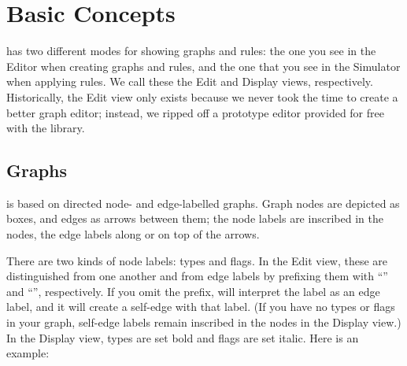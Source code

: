 \section{Basic Concepts}

\Groove has two different modes for showing graphs and rules: the one you see
in the Editor when creating graphs and rules, and the one that you see in the
Simulator when applying rules. We call these the Edit and Display views,
respectively.  Historically, the Edit view only exists because we never took
the time to create a better graph editor; instead, we ripped off a prototype
editor provided for free with the \JGraph library.

\subsection{Graphs}

\Groove is based on directed node- and edge-labelled graphs. Graph nodes are
depicted as boxes, and edges as arrows between them; the node labels are
inscribed in the nodes, the edge labels along or on top of the arrows.

There are two kinds of node labels: types and flags. In the Edit view, these
are distinguished from one another and from edge labels by prefixing them with
``\typeP'' and ``\flagP'', respectively. If you omit the prefix, \Groove will
interpret the label as an edge label, and it will create a self-edge with that
label. (If you have no types or flags in your graph, self-edge labels remain
inscribed in the nodes in the Display view.) In the Display view, types are set
bold and flags are set italic. Here is an example:


